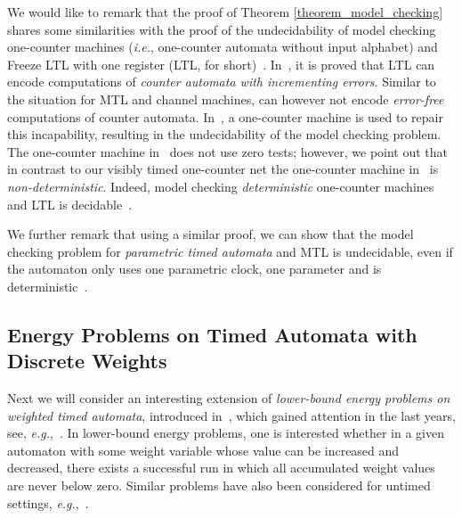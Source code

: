 \documentclass{CSML}
\theoremstyle{plain}\newtheorem{theorem}[thm]{Theorem}
\theoremstyle{plain}\newtheorem{corollary}[thm]{Corollary}
\theoremstyle{plain}\newtheorem{example}[thm]{Example}
\theoremstyle{plain}\newtheorem{lemma}[thm]{Lemma}
\theoremstyle{plain}\newtheorem{remark}[thm]{Remark}
\def\eg{{\em e.g.}}
\newcommand{\mtl}{MTL }
\newcommand*\ie{\textit{i.e.}}
\begin{document}
We would like to remark that the proof of Theorem \ref{theorem_model_checking} shares some similarities with the proof of the undecidability of model checking one-counter machines (\ie, one-counter automata without input alphabet) and Freeze LTL with one register (LTL, for short)~\cite{DLS-tcs10}. 
In~\cite{DBLP:journals/tocl/DemriL09},
it is proved that 
LTL can encode computations of \emph{counter automata with incrementing errors}. 
Similar to the situation for \mtl and channel machines,  can however not encode \emph{error-free} computations of counter automata. 
In~\cite{DLS-tcs10}, a one-counter machine is used to repair this incapability, resulting in the undecidability of the model checking problem. 
The one-counter machine in~\cite{DLS-tcs10} does not use zero tests; however, we point out that in contrast to our visibly timed one-counter net the one-counter machine in~\cite{DLS-tcs10} is \emph{non-deterministic}. Indeed, model checking \emph{deterministic} one-counter machines and LTL is decidable~\cite{DLS-tcs10}.

We further remark that using a similar proof, we can show that the model checking problem for \emph{parametric timed automata} and MTL is undecidable, even if the automaton only uses one parametric clock, one parameter and is deterministic~\cite{DBLP:journals/corr/Quaas14a}.


\subsection{Energy Problems on Timed Automata with Discrete Weights}
Next  we will consider an interesting extension of \emph{lower-bound energy problems on weighted timed automata}, introduced in~\cite{DBLP:conf/formats/BouyerFLMS08}, which gained  attention in the last years, see, \eg,~\cite{DBLP:journals/pe/BouyerLM14,DBLP:conf/lata/Quaas11,DBLP:conf/hybrid/BouyerFLM10}.
In lower-bound energy problems, 
one is interested whether in a given automaton with some weight variable whose value can be increased and decreased, there exists a successful run in which all accumulated weight values are never below zero.  
Similar problems have also been considered for untimed settings, \eg,~\cite{DBLP:conf/birthday/JuhlLR13,DBLP:conf/atva/EsikFLQ13,DBLP:conf/ictac/FahrenbergJLS11,DBLP:conf/icalp/BrazdilJK10}.  
\end{document}
